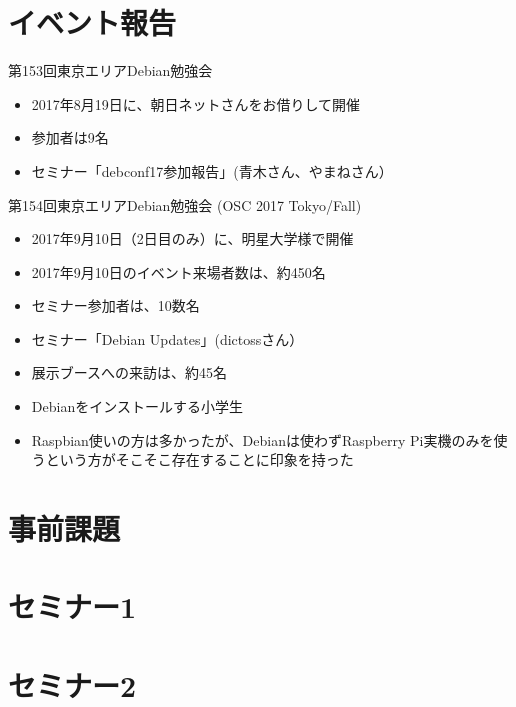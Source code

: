 \section{イベント報告}

\begin{frame}{第153回東京エリアDebian勉強会}
\begin{itemize}
\item 2017年8月19日に、朝日ネットさんをお借りして開催
\item 参加者は9名
\item セミナー「debconf17参加報告」(青木さん、やまねさん）
\end{itemize} 
\end{frame}


\begin{frame}{第154回東京エリアDebian勉強会 (OSC 2017 Tokyo/Fall)}
\begin{itemize}
\item 2017年9月10日（2日目のみ）に、明星大学様で開催
\item 2017年9月10日のイベント来場者数は、約450名
\item セミナー参加者は、10数名
\item セミナー「Debian Updates」(dictossさん）
\item 展示ブースへの来訪は、約45名
\item Debianをインストールする小学生
\item Raspbian使いの方は多かったが、Debianは使わずRaspberry Pi実機のみを使うという方がそこそこ存在することに印象を持った
\end{itemize} 
\end{frame}

\section{事前課題}
{\footnotesize
 
}

%

\section{セミナー1}

\section{セミナー2}

